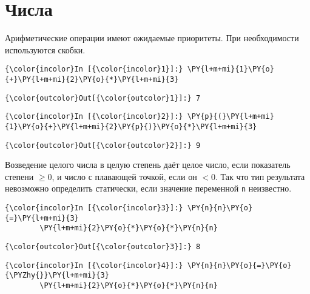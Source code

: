 \section{Числа}
\label{S101}

Арифметические операции имеют ожидаемые приоритеты. При необходимости
используются скобки.

    \begin{Verbatim}[commandchars=\\\{\}]
{\color{incolor}In [{\color{incolor}1}]:} \PY{l+m+mi}{1}\PY{o}{+}\PY{l+m+mi}{2}\PY{o}{*}\PY{l+m+mi}{3}
\end{Verbatim}

            \begin{Verbatim}[commandchars=\\\{\}]
{\color{outcolor}Out[{\color{outcolor}1}]:} 7
\end{Verbatim}
        
    \begin{Verbatim}[commandchars=\\\{\}]
{\color{incolor}In [{\color{incolor}2}]:} \PY{p}{(}\PY{l+m+mi}{1}\PY{o}{+}\PY{l+m+mi}{2}\PY{p}{)}\PY{o}{*}\PY{l+m+mi}{3}
\end{Verbatim}

            \begin{Verbatim}[commandchars=\\\{\}]
{\color{outcolor}Out[{\color{outcolor}2}]:} 9
\end{Verbatim}
        
    Возведение целого числа в целую степень даёт целое число, если
показатель степени \(\ge0\), и число с плавающей точкой, если он \(<0\).
Так что тип результата невозможно определить статически, если значение
переменной \texttt{n} неизвестно.

    \begin{Verbatim}[commandchars=\\\{\}]
{\color{incolor}In [{\color{incolor}3}]:} \PY{n}{n}\PY{o}{=}\PY{l+m+mi}{3}
        \PY{l+m+mi}{2}\PY{o}{*}\PY{o}{*}\PY{n}{n}
\end{Verbatim}

            \begin{Verbatim}[commandchars=\\\{\}]
{\color{outcolor}Out[{\color{outcolor}3}]:} 8
\end{Verbatim}
        
    \begin{Verbatim}[commandchars=\\\{\}]
{\color{incolor}In [{\color{incolor}4}]:} \PY{n}{n}\PY{o}{=}\PY{o}{\PYZhy{}}\PY{l+m+mi}{3}
        \PY{l+m+mi}{2}\PY{o}{*}\PY{o}{*}\PY{n}{n}
\end{Verbatim}

